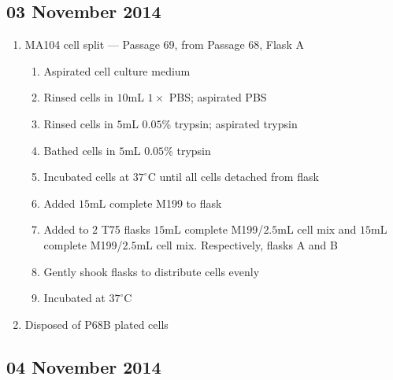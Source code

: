 
\subsection*{03 November 2014}

\begin{enumerate}
	\item MA104 cell split --- Passage 69, from Passage 68, Flask A
		\begin{enumerate}
			\item Aspirated cell culture medium
			\item Rinsed cells in $10$mL $1\times$ PBS; aspirated PBS
			\item Rinsed cells in $5$mL $0.05$\% trypsin; aspirated trypsin
			\item Bathed cells in $5$mL $0.05$\% trypsin
			\item Incubated cells at $37^{\circ}$C until all cells detached from flask
			\item Added $15$mL complete M199 to flask
			\item Added to $2$ T75 flasks $15$mL complete M199/$2.5$mL cell mix and $15$mL complete M199/$2.5$mL cell mix. Respectively, flasks A and B
			\item Gently shook flasks to distribute cells evenly
			\item Incubated at $37^{\circ}$C
		\end{enumerate}
	\item Disposed of P68B plated cells
\end{enumerate}

\subsection*{04 November 2014}

